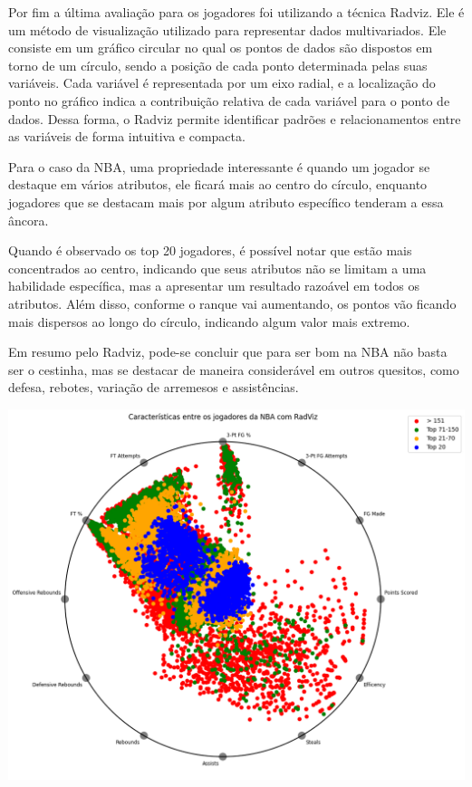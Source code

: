 \documentclass[
]{book}
\begin{document}
Por fim a última avaliação para os jogadores foi utilizando a técnica Radviz. Ele é um método de visualização utilizado para representar dados multivariados. Ele consiste em um gráfico circular no qual os pontos de dados são dispostos em torno de um círculo, sendo a posição de cada ponto determinada pelas suas variáveis. Cada variável é representada por um eixo radial, e a localização do ponto no gráfico indica a contribuição relativa de cada variável para o ponto de dados. Dessa forma, o Radviz permite identificar padrões e relacionamentos entre as variáveis de forma intuitiva e compacta.

Para o caso da NBA, uma propriedade interessante é quando um jogador se destaque em vários atributos, ele ficará mais ao centro do círculo, enquanto jogadores que se destacam mais por algum atributo específico tenderam a essa âncora.

Quando é observado os top 20 jogadores, é possível notar que estão mais concentrados ao centro, indicando que seus atributos não se limitam a uma habilidade específica, mas a apresentar um resultado razoável em todos os atributos. Além disso, conforme o ranque vai aumentando, os pontos vão ficando mais dispersos ao longo do círculo, indicando algum valor mais extremo.

Em resumo pelo Radviz, pode-se concluir que para ser bom na NBA não basta ser o cestinha, mas se destacar de maneira considerável em outros quesitos, como defesa, rebotes, variação de arremesos e assistências.

\includegraphics{imagens/download.png}
\end{document}
